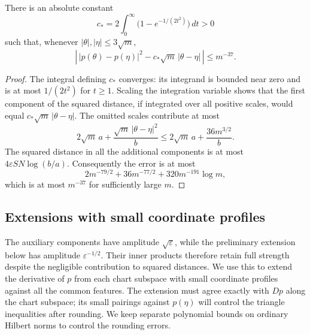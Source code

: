 \begin{lemma}
\label{lem:kernel}
There is an absolute constant
\[
 c_*=2\int_0^\infty\bigl(1-e^{-1/(2t^2)}\bigr)\,dt>0
\]
such that, whenever $|\theta|,|\eta|\le3\sqrt m$,
\begin{equation}
\label{ker:distance}
 \left|\,|p(\theta)-p(\eta)|^2
       -c_*\sqrt m\,|\theta-\eta|\,\right|\le m^{-37}.
\end{equation}
\end{lemma}

\begin{proof}
The integral defining $c_*$ converges: its integrand is bounded near zero
and is at most $1/(2t^2)$ for $t\ge1$.  Scaling the integration variable
shows that the first component of the squared distance, if integrated over
all positive scales, would equal $c_*\sqrt m\,|\theta-\eta|$.
The omitted scales contribute at most
\[
 2\sqrt m\,a+\frac{\sqrt m\,|\theta-\eta|^2}{b}
 \le 2\sqrt m\,a+\frac{36m^{3/2}}{b}.
\]
The squared distance in all the additional components is at most
$4\varepsilon SN\log(b/a)$.  Consequently the error is at most
\[
 2m^{-79/2}+36m^{-77/2}+320m^{-191}\log m,
\]
which is at most $m^{-37}$ for sufficiently large $m$.
\end{proof}

\subsection{Extensions with small coordinate profiles}

The auxiliary components have amplitude $\sqrt\varepsilon$, while the
preliminary extension below has amplitude $\varepsilon^{-1/2}$. Their
inner products therefore retain full strength despite the negligible
contribution to squared distances. We use this to extend the derivative
of $p$ from each chart subspace with small coordinate profiles against
all the common features. The extension must agree exactly with $Dp$ along
the chart subspace; its small pairings against $p(\eta)$ will control the
triangle inequalities after rounding. We keep separate polynomial bounds
on ordinary Hilbert norms to control the rounding errors.

